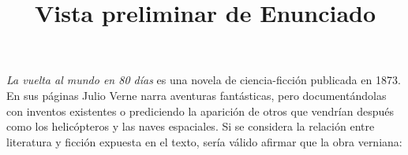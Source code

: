 \documentclass[a4paper,12pt]{article}\usepackage[utf8]{inputenc}\usepackage[spanish]{babel}\usepackage{times}
\title{Vista preliminar de Enunciado}
\begin{document}
\twocolumn 

\maketitle

\textit{ La vuelta al mundo en 80 días} es una novela de ciencia-ficción publicada en 1873. En sus páginas Julio Verne narra aventuras fantásticas, pero documentándolas con inventos       existentes o prediciendo la aparición de otros que vendrían después como los helicópteros y las naves espaciales. Si se considera la relación entre literatura y ficción expuesta en el texto, sería válido afirmar que la obra verniana:
\end{document}
